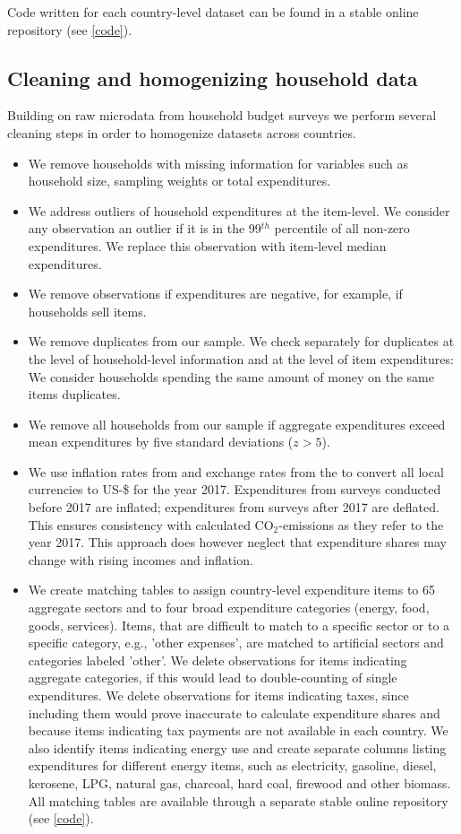 \documentclass[12pt, a4paper]{article}
\begin{document}
Code written for each country-level dataset can be found in a stable online repository (see \ref{code}).

\subsection{Cleaning and homogenizing household data}

Building on raw microdata from household budget surveys we perform several cleaning steps in order to homogenize datasets across countries.

\begin{itemize}
    \item We remove households with missing information for variables such as household size, sampling weights or total expenditures.
    \item We address outliers of household expenditures at the item-level. We consider any observation an outlier if it is in the 99$^{th}$ percentile of all non-zero expenditures. We replace this observation with item-level median expenditures.
    \item We remove observations if expenditures are negative, for example, if households sell items.
    \item We remove duplicates from our sample. We check separately for duplicates at the level of household-level information and at the level of item expenditures: We consider households spending the same amount of money on the same items duplicates.
    \item We remove all households from our sample if aggregate expenditures exceed mean expenditures by five standard deviations ($z>5$).
    \item We use inflation rates from \textcite{IMF.2020} and exchange rates from the \textcite{WorldBankGroup.2023} to convert all local currencies to US-\$ for the year 2017. Expenditures from surveys conducted before 2017 are inflated; expenditures from surveys after 2017 are deflated. This ensures consistency with calculated CO$_{2}$-emissions as they refer to the year 2017. This approach does however neglect that expenditure shares may change with rising incomes and inflation.
    \item We create matching tables to assign country-level expenditure items to 65 aggregate sectors and to four broad expenditure categories (energy, food, goods, services). Items, that are difficult to match to a specific sector or to a specific category, e.g., 'other expenses', are matched to artificial sectors and categories labeled 'other'. We delete observations for items indicating aggregate categories, if this would lead to double-counting of single expenditures. We delete observations for items indicating taxes, since including them would prove inaccurate to calculate expenditure shares and because items indicating tax payments are not available in each country. We also identify items indicating energy use and create separate columns listing expenditures for different energy items, such as electricity, gasoline, diesel, kerosene, LPG, natural gas, charcoal, hard coal, firewood and other biomass. All matching tables are available through a separate stable online repository (see \ref{code}).

\end{itemize}
\end{document}
